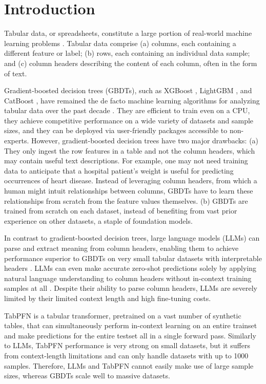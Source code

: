\section{Introduction}

Tabular data, or spreadsheets, constitute a large portion of real-world machine learning problems \citep{borisov2022deep}.  Tabular data comprise (a) columns, each containing a different feature or label; (b) rows, each containing an individual data sample; and (c) column headers describing the content of each column, often in the form of text.

Gradient-boosted decision trees (GBDTs), such as XGBoost \citep{chen2016xgboost}, LightGBM \citep{ke2017lightgbm}, and CatBoost \citep{prokhorenkova2018catboost}, have remained the de facto machine learning algorithms for analyzing tabular data over the past decade \citep{mcelfresh2024neural}.  They are efficient to train even on a CPU, they achieve competitive performance on a wide variety of datasets and sample sizes, and they can be deployed via user-friendly packages accessible to non-experts.  However, gradient-boosted decision trees have two major drawbacks:  (a) They only ingest the row features in a table and not the column headers, which may contain useful text descriptions.  For example, one may not need training data to anticipate that a hospital patient’s weight is useful for predicting occurrences of heart disease.  Instead of leveraging column headers, from which a human might intuit relationships between columns, GBDTs have to learn these relationships from scratch from the feature values themselves.  (b) GBDTs are trained from scratch on each dataset, instead of benefiting from vast prior experience on other datasets, a staple of foundation models.

In contrast to gradient-boosted decision trees, large language models (LLMs) can parse and extract meaning from column headers, enabling them to achieve performance superior to GBDTs on very small tabular datasets with interpretable headers \citep{hegselmann2023tabllm}.  LLMs can even make accurate zero-shot predictions solely by applying natural language understanding to column headers without in-context training samples at all \citep{hegselmann2023tabllm}.  Despite their ability to parse column headers, LLMs are severely limited by their limited context length and high fine-tuning costs. 

TabPFN \citep{hollmann2023tabpfn} is a tabular transformer, pretrained on a vast number of synthetic tables, that can simultaneously perform in-context learning on an entire trainset and make predictions for the entire testset all in a single forward pass. Similarly to LLMs, TabPFN performance is very strong on small datasets, but it suffers from context-length limitations and can only handle datasets with up to 1000 samples. Therefore, LLMs and TabPFN cannot easily make use of large sample sizes, whereas GBDTs scale well to massive datasets.

